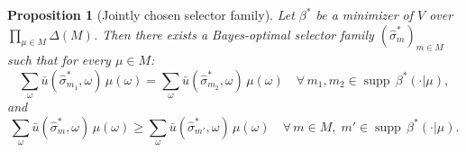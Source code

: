 \documentclass[12pt]{article}
\newtheorem{proposition}[theorem]{Proposition}
\newcommand{\supp}{\operatorname{supp}}
\begin{document}
\begin{proposition}[Jointly chosen selector family]
\label{prop:selector}
Let $\beta^*$ be a minimizer of $V$ over $\prod_{\mu \in M} \Delta(M)$. Then there exists a Bayes-optimal selector family $(\hat\sigma^*_m)_{m \in M}$ such that for every $\mu \in M$:
\begin{equation}
\label{eq:foc_equal}
\sum_\omega \bar{u}(\hat\sigma^*_{m_1}, \omega)\,\mu(\omega) = \sum_\omega \bar{u}(\hat\sigma^*_{m_2}, \omega)\,\mu(\omega) \quad \forall\, m_1, m_2 \in \supp\,\beta^*(\cdot|\mu),
\end{equation}
and
\begin{equation}
\label{eq:foc_ineq}
\sum_\omega \bar{u}(\hat\sigma^*_m, \omega)\,\mu(\omega) \geq \sum_\omega \bar{u}(\hat\sigma^*_{m'}, \omega)\,\mu(\omega) \quad \forall\, m \in M,\; m' \in \supp\,\beta^*(\cdot|\mu).
\end{equation}
\end{proposition}
\end{document}
